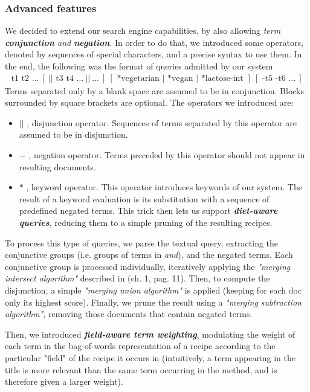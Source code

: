 \subsubsection{Advanced features}

We decided to extend our search engine capabilities, by also allowing \textit{term \textbf{conjunction} and \textbf{negation}}. In order to do that, we introduced some operators, denoted by sequences of special characters, and a precise syntax to use them. In the end, the following was the format of queries admitted by our system
\begin{align*}
	\text{t1 t2 }\ldots \ [ \ || \text{ t3 t4 } \ldots \ || \ \ldots \ ] \ [ \text{ *vegetarian } | \text{ *vegan } | \text{ *lactose-int }] \ [ \text{ -t5 -t6 }\ldots \ ]
\end{align*}
Terms separated only by a blank space are assumed to be in conjunction. Blocks surrounded by square brackets are optional. The operators we introduced are:
\begin{itemize}
	\item $||$ , disjunction operator. Sequences of terms separated by this operator are assumed to be in disjunction.
	
	\item $-$ , negation operator. Terms preceded by this operator should not appear in resulting documents.
	
	\item $*$ , keyword operator. This operator introduces keywords of our system. The result of a keyword evaluation is its substitution with a sequence of predefined negated terms. This trick then lets us support \textit{\textbf{diet-aware queries}}, reducing them to a simple pruning of the resulting recipes.
\end{itemize}
To process this type of queries, we parse the textual query, extracting the conjunctive groups (i.e. groups of terms in \textit{and}), and the negated terms. Each conjunctive group is processed individually, iteratively applying the \textit{"merging intersect algorithm"} described in \cite{iir} (ch. 1, pag. 11). Then, to compute the disjunction, a simple \textit{"merging union algorithm"} is applied (keeping for each doc only its highest score). Finally, we prune the result using a \textit{"merging subtraction algorithm"}, removing those documents that contain negated terms.

\medskip

\noindent Then, we introduced \textit{\textbf{field-aware term weighting}}, modulating the weight of each term in the bag-of-words representation of a recipe according to the particular "field" of the recipe it occurs in (intuitively, a term appearing in the title is more relevant than the same term occurring in the method, and is therefore given a larger weight).

